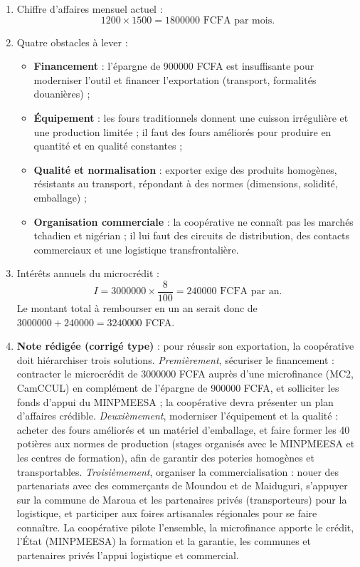 \documentclass[11pt]{article}
\begin{document}
\begin{corrige}
\begin{enumerate}
\item Chiffre d'affaires mensuel actuel :
\[ \num{1200} \times \num{1500} = \num{1800000} \text{ FCFA par mois.} \]
\item Quatre obstacles à lever :
\begin{itemize}
\item \textbf{Financement} : l'épargne de \num{900000} FCFA est insuffisante pour moderniser l'outil et financer l'exportation (transport, formalités douanières) ;
\item \textbf{Équipement} : les fours traditionnels donnent une cuisson irrégulière et une production limitée ; il faut des fours améliorés pour produire en quantité et en qualité constantes ;
\item \textbf{Qualité et normalisation} : exporter exige des produits homogènes, résistants au transport, répondant à des normes (dimensions, solidité, emballage) ;
\item \textbf{Organisation commerciale} : la coopérative ne connaît pas les marchés tchadien et nigérian ; il lui faut des circuits de distribution, des contacts commerciaux et une logistique transfrontalière.
\end{itemize}
\item Intérêts annuels du microcrédit :
\[ I = \num{3000000} \times \frac{8}{100} = \num{240000} \text{ FCFA par an.} \]
Le montant total à rembourser en un an serait donc de $\num{3000000} + \num{240000} = \num{3240000}$ FCFA.
\item \textbf{Note rédigée (corrigé type)} : pour réussir son exportation, la coopérative doit hiérarchiser trois solutions. \emph{Premièrement}, sécuriser le financement : contracter le microcrédit de \num{3000000} FCFA auprès d'une microfinance (MC2, CamCCUL) en complément de l'épargne de \num{900000} FCFA, et solliciter les fonds d'appui du MINPMEESA ; la coopérative devra présenter un plan d'affaires crédible. \emph{Deuxièmement}, moderniser l'équipement et la qualité : acheter des fours améliorés et un matériel d'emballage, et faire former les 40 potières aux normes de production (stages organisés avec le MINPMEESA et les centres de formation), afin de garantir des poteries homogènes et transportables. \emph{Troisièmement}, organiser la commercialisation : nouer des partenariats avec des commerçants de Moundou et de Maiduguri, s'appuyer sur la commune de Maroua et les partenaires privés (transporteurs) pour la logistique, et participer aux foires artisanales régionales pour se faire connaître. La coopérative pilote l'ensemble, la microfinance apporte le crédit, l'État (MINPMEESA) la formation et la garantie, les communes et partenaires privés l'appui logistique et commercial.

\end{enumerate}
\end{corrige}
\end{document}
